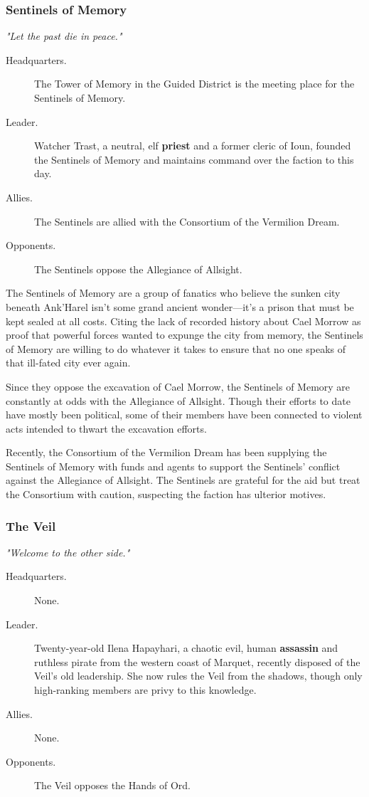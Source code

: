 \documentclass[a4paper, 11pt, bg=full, twocolumn, nooutline]{dndbook}
\begin{document}
\subsubsection{Sentinels of Memory}

\textit{"Let the past die in peace."}

\begin{description}
\item[Headquarters.] The Tower of Memory in the Guided District is the meeting place for the Sentinels of Memory.
\item[Leader.] Watcher Trast, a neutral, elf \textbf{priest} and a former cleric of Ioun, founded the Sentinels of Memory and maintains command over the faction to this day.
\item[Allies.] The Sentinels are allied with the Consortium of the Vermilion Dream.
\item[Opponents.] The Sentinels oppose the Allegiance of Allsight.
\end{description}

The Sentinels of Memory are a group of fanatics who believe the sunken city beneath Ank'Harel isn't some grand ancient wonder---it's a prison that must be kept sealed at all costs. Citing the lack of recorded history about Cael Morrow as proof that powerful forces wanted to expunge the city from memory, the Sentinels of Memory are willing to do whatever it takes to ensure that no one speaks of that ill-fated city ever again.

Since they oppose the excavation of Cael Morrow, the Sentinels of Memory are constantly at odds with the Allegiance of Allsight. Though their efforts to date have mostly been political, some of their members have been connected to violent acts intended to thwart the excavation efforts.

Recently, the Consortium of the Vermilion Dream has been supplying the Sentinels of Memory with funds and agents to support the Sentinels' conflict against the Allegiance of Allsight. The Sentinels are grateful for the aid but treat the Consortium with caution, suspecting the faction has ulterior motives.

\subsubsection{The Veil}

\textit{"Welcome to the other side."}

\begin{description}
\item[Headquarters.] None.
\item[Leader.] Twenty-year-old Ilena Hapayhari, a chaotic evil, human \textbf{assassin} and ruthless pirate from the western coast of Marquet, recently disposed of the Veil's old leadership. She now rules the Veil from the shadows, though only high-ranking members are privy to this knowledge.
\item[Allies.] None.
\item[Opponents.] The Veil opposes the Hands of Ord.
\end{description}
\end{document}

